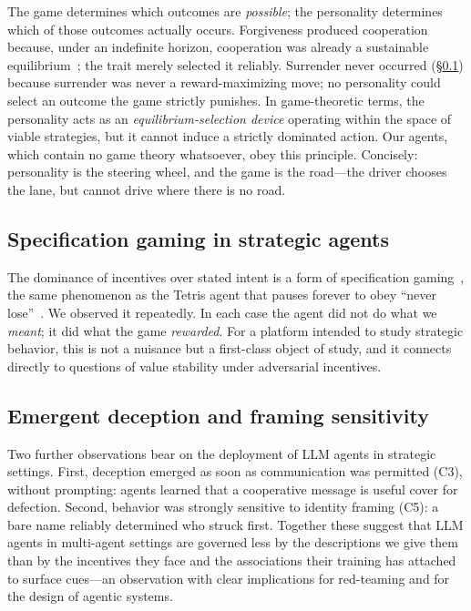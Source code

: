 The game determines which outcomes are \emph{possible}; the personality determines which of those outcomes actually occurs. Forgiveness produced cooperation because, under an indefinite horizon, cooperation was already a sustainable equilibrium~\cite{fudenberg1986folk}; the trait merely selected it reliably. Surrender never occurred (\S\ref{sec:discussion-spec}) because surrender was never a reward-maximizing move; no personality could select an outcome the game strictly punishes. In game-theoretic terms, the personality acts as an \emph{equilibrium-selection device} operating within the space of viable strategies, but it cannot induce a strictly dominated action. Our agents, which contain no game theory whatsoever, obey this principle. Concisely: personality is the steering wheel, and the game is the road---the driver chooses the lane, but cannot drive where there is no road.

\subsection{Specification gaming in strategic agents}
\label{sec:discussion-spec}
The dominance of incentives over stated intent is a form of specification gaming~\cite{amodei2016concrete, krakovna2020specification}, the same phenomenon as the Tetris agent that pauses forever to obey ``never lose''~\cite{murphy2013mario}. We observed it repeatedly.  In each case the agent did not do what we \emph{meant}; it did what the game \emph{rewarded}. For a platform intended to study strategic behavior, this is not a nuisance but a first-class object of study, and it connects directly to questions of value stability under adversarial incentives.

\subsection{Emergent deception and framing sensitivity}
Two further observations bear on the deployment of LLM agents in strategic settings. First, deception emerged as soon as communication was permitted (C3), without prompting: agents learned that a cooperative message is useful cover for defection. Second, behavior was strongly sensitive to identity framing (C5): a bare name reliably determined who struck first. Together these suggest that LLM agents in multi-agent settings are governed less by the descriptions we give them than by the incentives they face and the associations their training has attached to surface cues---an observation with clear implications for red-teaming and for the design of agentic systems.

